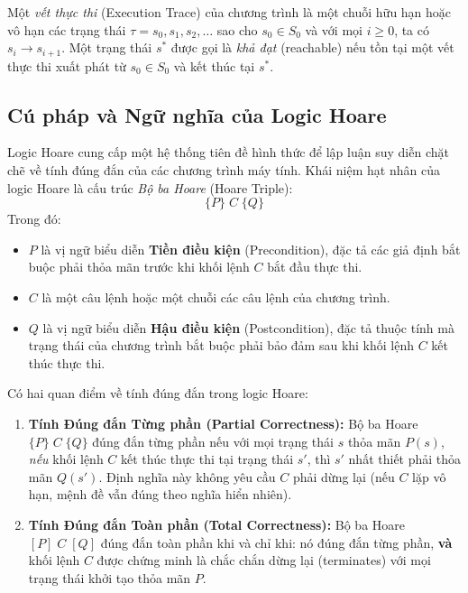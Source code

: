 Một \textit{vết thực thi} (Execution Trace) của chương trình là một chuỗi hữu hạn hoặc vô hạn các trạng thái $\tau = s_0, s_1, s_2, \dots$ sao cho $s_0 \in S_0$ và với mọi $i \ge 0$, ta có $s_i \rightarrow s_{i+1}$. Một trạng thái $s^*$ được gọi là \textit{khả đạt} (reachable) nếu tồn tại một vết thực thi xuất phát từ $s_0 \in S_0$ và kết thúc tại $s^*$.

\subsection{Cú pháp và Ngữ nghĩa của Logic Hoare}
Logic Hoare \cite{hoare1969axiomatic} cung cấp một hệ thống tiên đề hình thức để lập luận suy diễn chặt chẽ về tính đúng đắn của các chương trình máy tính. Khái niệm hạt nhân của logic Hoare là cấu trúc \textit{Bộ ba Hoare} (Hoare Triple):
\begin{equation}
\{P\} \; C \; \{Q\}
\end{equation}
Trong đó:
\begin{itemize}
    \item $P$ là vị ngữ biểu diễn \textbf{Tiền điều kiện} (Precondition), đặc tả các giả định bắt buộc phải thỏa mãn trước khi khối lệnh $C$ bắt đầu thực thi.
    \item $C$ là một câu lệnh hoặc một chuỗi các câu lệnh của chương trình.
    \item $Q$ là vị ngữ biểu diễn \textbf{Hậu điều kiện} (Postcondition), đặc tả thuộc tính mà trạng thái của chương trình bắt buộc phải bảo đảm sau khi khối lệnh $C$ kết thúc thực thi.
\end{itemize}

Có hai quan điểm về tính đúng đắn trong logic Hoare:
\begin{enumerate}
    \item \textbf{Tính Đúng đắn Từng phần (Partial Correctness):} Bộ ba Hoare $\{P\} \; C \; \{Q\}$ đúng đắn từng phần nếu với mọi trạng thái $s$ thỏa mãn $P(s)$, \textit{nếu} khối lệnh $C$ kết thúc thực thi tại trạng thái $s'$, thì $s'$ nhất thiết phải thỏa mãn $Q(s')$. Định nghĩa này không yêu cầu $C$ phải dừng lại (nếu $C$ lặp vô hạn, mệnh đề vẫn đúng theo nghĩa hiển nhiên).
    \item \textbf{Tính Đúng đắn Toàn phần (Total Correctness):} Bộ ba Hoare $[P] \; C \; [Q]$ đúng đắn toàn phần khi và chỉ khi: nó đúng đắn từng phần, \textbf{và} khối lệnh $C$ được chứng minh là chắc chắn dừng lại (terminates) với mọi trạng thái khởi tạo thỏa mãn $P$.
\end{enumerate}

